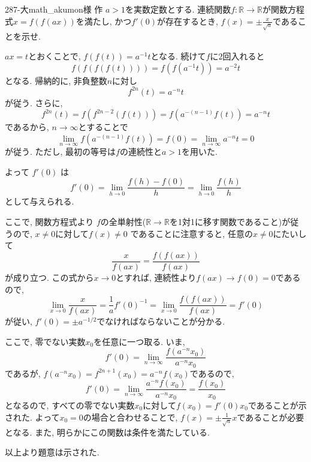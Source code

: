 \begin{thm}{287}{-大}{math\_akumon様 作}
$a>1$を実数定数とする. 連続関数$f:\mathbb{R}\to \mathbb{R}$が関数方程式$x = f(f(ax))$を満たし, かつ$f'(0)$が存在するとき, $f(x) = \pm \frac{x}{\sqrt{a}}$であることを示せ. 
\end{thm}

$ax = t$とおくことで, $f(f(t)) = a^{-1} t$となる. 続けて$f$に$2$回入れると
$$
f(f(f(f(t)))) = f(f(a^{-1}t)) = a^{-2}t
$$
となる. 帰納的に, 非負整数$n$に対し
$$
f^{2n}(t) = a^{-n} t
$$
が従う. さらに, 
$$
f^{2n}(t) = f(f^{2n-2}(f(t))) = f(a^{-(n-1)}f(t) ) = a^{-n}t
$$
であるから, $n\to \infty$とすることで
$$
\lim_{n\to \infty} f(a^{-(n-1)} f(t)) = f(0) = \lim_{n\to \infty} a^{-n}t = 0
$$
が従う. ただし, 最初の等号は$f$の連続性と$a>1$を用いた. 

よって $f'(0)$ は
\[
f'(0) = \lim_{h\to 0} \frac{f(h) - f(0)}{h} = \lim_{h\to 0} \frac{f(h)}{h}
\]
として与えられる. 

ここで, 関数方程式より $f$の全単射性($\mathbb{R}\to \mathbb{R}$を1対1に移す関数であること)が従うので, $x\neq 0$に対して$f(x) \neq 0$ であることに注意すると, 任意の$x\neq 0$にたいして
\[
\frac{x}{f(ax)} = \frac{f(f(ax))}{f(ax)}
\]
が成り立つ. この式から$x\to 0$とすれば, 連続性より$f(ax)\to f(0) = 0$であるので, 
\[
\lim_{x\to 0}\frac{x}{f(ax)} = \frac{1}{a}f'(0)^{-1} = \lim_{x\to 0} \frac{f(f(ax))}{f(ax)} = f'(0)
\]
が従い, $f'(0) = \pm a^{-1/2}$でなければならないことが分かる. 

ここで, 零でない実数$x_0$を任意に一つ取る. いま, 
\[
f'(0) = \lim_{n\to \infty} \frac{f(a^{-n}x_0)}{a^{-n}x_0}
\]
であるが, $f(a^{-n}x_0) = f^{2n+1}(x_0) = a^{-n}f(x_0)$であるので, 
\[
f'(0) = \lim_{n\to \infty} \frac{a^{-n}f(x_0)}{a^{-n}x_0} = \frac{f(x_0)}{x_0}
\]
となるので, すべての零でない実数$x_0$に対して$f(x_0) = f'(0)x_0$であることが示された. よって$x_0=0$の場合と合わせることで, $f(x) = \pm\frac{1}{\sqrt{a}}x$であることが必要となる. また, 明らかにこの関数は条件を満たしている. 

以上より題意は示された. 


